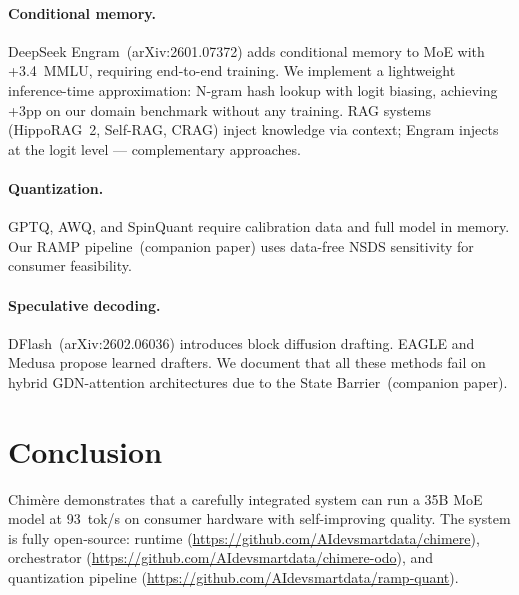 \documentclass[10pt,a4paper]{article}
\begin{document}
\paragraph{Conditional memory.}
DeepSeek Engram~(arXiv:2601.07372) adds conditional memory to MoE with +3.4~MMLU, requiring end-to-end training.
We implement a lightweight inference-time approximation: N-gram hash lookup with logit biasing, achieving +3pp on our domain benchmark without any training.
RAG systems (HippoRAG~2, Self-RAG, CRAG) inject knowledge via context; Engram injects at the logit level --- complementary approaches.

\paragraph{Quantization.}
GPTQ, AWQ, and SpinQuant require calibration data and full model in memory.
Our RAMP pipeline~(companion paper) uses data-free NSDS sensitivity for consumer feasibility.

\paragraph{Speculative decoding.}
DFlash~(arXiv:2602.06036) introduces block diffusion drafting.
EAGLE and Medusa propose learned drafters.
We document that all these methods fail on hybrid GDN-attention architectures due to the State Barrier~(companion paper).

\section{Conclusion}

Chim\`ere demonstrates that a carefully integrated system can run a 35B MoE model at 93~tok/s on consumer hardware with self-improving quality. The system is fully open-source: runtime (\url{https://github.com/AIdevsmartdata/chimere}), orchestrator (\url{https://github.com/AIdevsmartdata/chimere-odo}), and quantization pipeline (\url{https://github.com/AIdevsmartdata/ramp-quant}).
\end{document}
